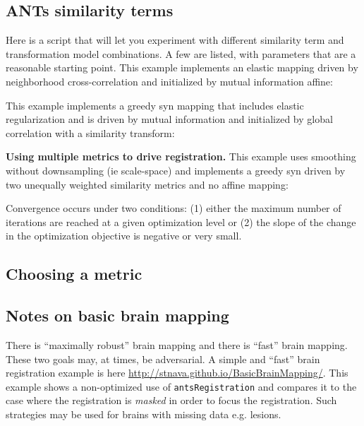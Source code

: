 \documentclass{InsightArticle}
\begin{document}
\subsection{ANTs similarity terms}
Here is a script that will let you experiment with different similarity term 
and transformation model combinations.  A few are listed, with parameters 
that are a reasonable starting point.  This example implements an
elastic mapping driven by neighborhood cross-correlation and initialized by mutual information affine:

This example implements a greedy syn mapping that includes elastic regularization and is driven by mutual
information and initialized by global correlation with a similarity transform:


\noindent\textbf{Using multiple metrics to drive registration.}
This example uses smoothing without downsampling (ie scale-space) and
implements a greedy syn driven by two unequally weighted similarity metrics and no affine mapping:

Convergence occurs under two conditions: (1) either the maximum number of 
iterations are reached at a given optimization level or (2) the slope 
of the change in the optimization objective is negative or very small. 


\subsection{Choosing a metric}




\subsection{Notes on basic brain mapping}
There is ``maximally robust'' brain mapping and there is ``fast''
brain mapping.  These two goals may, at times, be adversarial.  
A simple and ``fast'' brain registration example is here
\href{http://stnava.github.io/BasicBrainMapping/}{http://stnava.github.io/BasicBrainMapping/}.
This example shows a non-optimized use of \texttt{antsRegistration}
and compares it to the case where the registration is \textit{masked}
in order to focus the registration.  Such strategies may be used for
brains with missing data e.g. lesions.
\end{document}
